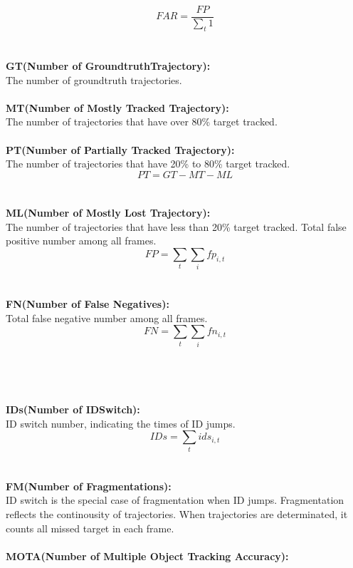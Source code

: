                 $$FAR=\frac{FP}{\sum_t 1}$$\\
                \\\textbf{GT(Number of GroundtruthTrajectory):}\\
                The number of groundtruth trajectories.\\
                \\\textbf{MT(Number of Mostly Tracked Trajectory):}\\
                The number of trajectories that have over 80\% target tracked.\\
                \\\textbf{PT(Number of Partially Tracked Trajectory):}\\
                The number of trajectories that have 20\% to 80\% target tracked.\\
                $$PT= GT - MT - ML$$\\ 
                \\\textbf{ML(Number of Mostly Lost Trajectory):}\\
                The number of trajectories that have less than 20\% target tracked. Total false positive number among all frames.\\
                $$FP=\sum_t \sum_i {fp}_{i, t}$$\\
                \\\textbf{FN(Number of False Negatives):}\\ 
                Total false negative number among all frames.\\
                $$FN=\sum_t \sum_i fn_{i, t}$$\\
                \\\\\\\textbf{IDs(Number of IDSwitch):}\\
                ID switch number, indicating the times of ID jumps.\\
                $$IDs=\sum_t ids_{i, t}$$\\
                \\\textbf{FM(Number of Fragmentations):}\\
                ID switch is the special case of fragmentation when ID jumps. Fragmentation reflects the continousity of trajectories. When trajectories are determinated, it counts all missed target in
                each frame.\\
                \\\textbf{MOTA(Number of Multiple Object Tracking Accuracy):}\\

